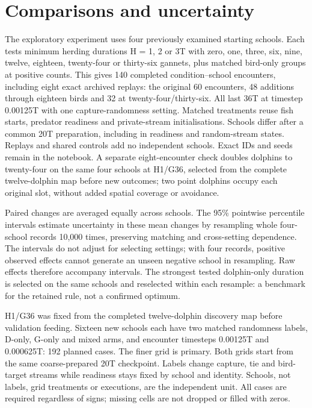 \documentclass[10pt,a4paper,twocolumn]{article}
\begin{document}
\section{Comparisons and uncertainty}
The exploratory experiment uses four previously examined starting schools. Each tests minimum herding durations H = 1, 2 or 3T with zero, one, three, six, nine, twelve, eighteen, twenty-four or thirty-six gannets, plus matched bird-only groups at positive counts. This gives 140 completed condition--school encounters, including eight exact archived replays: the original 60 encounters, 48 additions through eighteen birds and 32 at twenty-four/thirty-six. All last 36T at timestep 0.00125T with one capture-randomness setting. Matched treatments reuse fish starts, predator readiness and private-stream initialisations. Schools differ after a common 20T preparation, including in readiness and random-stream states. Replays and shared controls add no independent schools. Exact IDs and seeds remain in the notebook. A separate eight-encounter check doubles dolphins to twenty-four on the same four schools at H1/G36, selected from the complete twelve-dolphin map before new outcomes; two point dolphins occupy each original slot, without added spatial coverage or avoidance.

Paired changes are averaged equally across schools. The 95\% pointwise percentile intervals estimate uncertainty in these mean changes by resampling whole four-school records 10,000 times, preserving matching and cross-setting dependence. The intervals do not adjust for selecting settings; with four records, positive observed effects cannot generate an unseen negative school in resampling. Raw effects therefore accompany intervals. The strongest tested dolphin-only duration is selected on the same schools and reselected within each resample: a benchmark for the retained rule, not a confirmed optimum.

H1/G36 was fixed from the completed twelve-dolphin discovery map before validation feeding. Sixteen new schools each have two matched randomness labels, D-only, G-only and mixed arms, and encounter timesteps 0.00125T and 0.000625T: 192 planned cases. The finer grid is primary. Both grids start from the same coarse-prepared 20T checkpoint. Labels change capture, tie and bird-target streams while readiness stays fixed by school and identity. Schools, not labels, grid treatments or executions, are the independent unit. All cases are required regardless of signs; missing cells are not dropped or filled with zeros.
\end{document}
